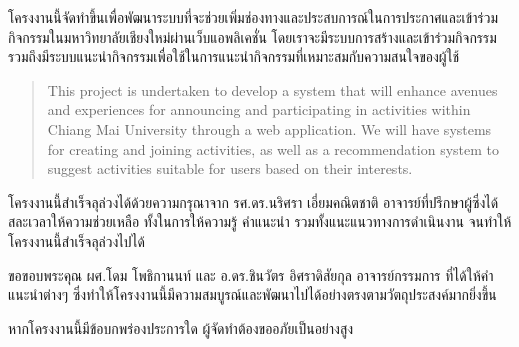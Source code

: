 \maketitle
\makesignature

\ifproject
\begin{abstractTH}
    \hspace{4ex} 
    โครงงานนี้จัดทำขึ้นเพื่อพัฒนาระบบที่จะช่วยเพิ่มช่องทางและประสบการณ์ในการประกาศและเข้าร่วมกิจกรรมในมหาวิทยาลัยเชียงใหม่ผ่านเว็บแอพลิเคชั่น
    โดยเราจะมีระบบการสร้างและเข้าร่วมกิจกรรม รวมถึงมีระบบแนะนํากิจกรรมเพื่อใช้ในการแนะนํากิจกรรมที่เหมาะสมกับความสนใจของผู้ใช้
\end{abstractTH}

\begin{abstract}
    \hspace{4ex} 
    This project is undertaken to develop a system that will enhance avenues and experiences for announcing and participating in activities within Chiang Mai University through a web application. We will have systems for creating and joining activities, as well as a recommendation system to suggest activities suitable for users based on their interests.

\end{abstract}

\iffalse
\begin{dedication}
This document is dedicated to all Chiang Mai University students.

Dedication page is optional.
\end{dedication}
\fi %

\begin{acknowledgments}
    \hspace{4ex} โครงงานนี้สำเร็จลุล่วงได้ด้วยความกรุณาจาก รศ.ดร.นริศรา เอี่ยมคณิตชาติ อาจารย์ที่ปรึกษาผู้ซึ่งได้สละเวลาให้ความช่วยเหลือ ทั้งในการให้ความรู้ คำแนะนำ รวมทั้งแนะแนวทางการดำเนินงาน จนทำให้โครงงานนี้สำเร็จลุล่วงไปได้

    \enskip ขอขอบพระคุณ ผศ.โดม โพธิกานนท์ และ อ.ดร.ชินวัตร อิศราดิสัยกุล อาจารย์กรรมการ ที่ได้ให้คำแนะนำต่างๆ ซึ่งทำให้โครงงานนี้มีความสมบูรณ์และพัฒนาไปได้อย่างตรงตามวัตถุประสงค์มากยิ่งขึ้น

    \enskip หากโครงงานนี้มีข้อบกพร่องประการใด ผู้จัดทำต้องขออภัยเป็นอย่างสูง

\end{acknowledgments}%
\fi %

\contentspage

\ifproject
\figurelistpage

\tablelistpage
\fi %



